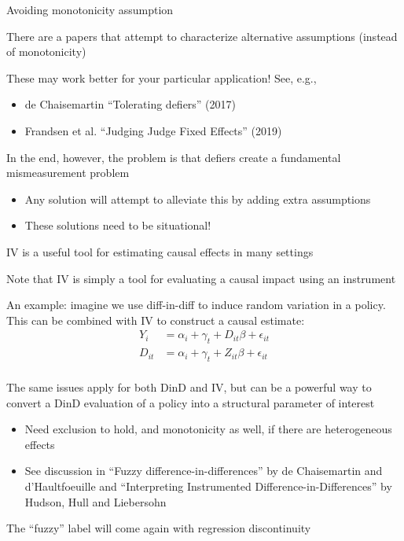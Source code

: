 \documentclass[notes,11pt, aspectratio=169]{beamer}
\newenvironment{wideitemize}{\itemize\addtolength{\itemsep}{10pt}}{\enditemize}
\begin{document}
\begin{frame}{Avoiding monotonicity assumption}
  \begin{wideitemize}
  \item There are a papers that attempt to characterize alternative
    assumptions (instead of monotonicity)
  \item These may work better for your particular application! See, e.g.,
    \begin{itemize}
    \item de Chaisemartin ``Tolerating defiers'' (2017)
    \item Frandsen et al. ``Judging Judge Fixed Effects'' (2019)
    \end{itemize}
  \item In the end, however, the problem is that defiers create a
    fundamental mismeasurement problem
    \begin{itemize}
    \item Any solution will attempt to alleviate this by adding extra assumptions
    \item These solutions need to be situational!
    \end{itemize}
    
  \end{wideitemize}
  
\end{frame}

\begin{frame}{IV is a useful tool for estimating causal effects in many settings}
  \begin{wideitemize}
  \item Note that IV is simply a tool for evaluating a causal impact using an instrument
  \item An example: imagine we use diff-in-diff to induce random
    variation in a policy. This can be combined with IV to construct a causal estimate:
    \begin{align}
      Y_{i} &= \alpha_{i} + \gamma_{t} + D_{it}\beta + \epsilon_{it}\\
      D_{it} &= \alpha_{i} + \gamma_{t} + Z_{it}\beta + \epsilon_{it}\\      
    \end{align}
  \item The same issues apply for both DinD and IV, but can be a
    powerful way to convert a DinD evaluation of a policy into a
    structural parameter of interest
    \begin{itemize}
    \item Need exclusion to hold, and monotonicity as well, if there
      are heterogeneous effects
    \item See discussion in ``Fuzzy difference-in-differences'' by de
      Chaisemartin and d'Haultfoeuille and ``Interpreting Instrumented
      Difference-in-Differences'' by Hudson, Hull and Liebersohn
    \end{itemize}
  \item The ``fuzzy'' label will come again with regression
    discontinuity
  \end{wideitemize}
\end{frame}
\end{document}
